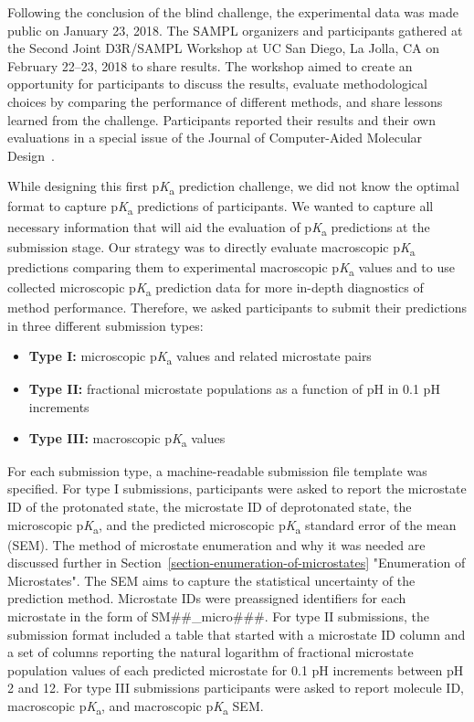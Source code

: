 \documentclass[9pt,lineno,final]{elife}
\newcommand{\pKa}{p\textit{K}\textsubscript{a}}
\begin{document}
Following the conclusion of the blind challenge, the experimental data was made public on January 23, 2018. 
The SAMPL organizers and participants gathered at the Second Joint D3R/SAMPL Workshop at UC San Diego, La Jolla, CA on February 22--23, 2018 to share results.
The workshop aimed to create an opportunity for participants to discuss the results, evaluate methodological choices by comparing the performance of different methods, and share lessons learned from  the challenge. 
Participants reported their results and their own evaluations in a special issue of the Journal of Computer-Aided Molecular Design~\citep{JCAMD_special_issue_pKa}. 

While designing this first \pKa{} prediction challenge, we did not know the optimal format to capture \pKa{} predictions of participants. 
We wanted to capture all necessary information that will aid the evaluation of \pKa{} predictions at the submission stage. 
Our strategy was to directly evaluate macroscopic \pKa{} predictions comparing them to experimental macroscopic \pKa{} values and to use collected microscopic \pKa{} prediction data for more in-depth diagnostics of method performance.
Therefore, we asked participants to submit their predictions in three different submission types: 
\begin{itemize}
\item {\bf Type I:} microscopic \pKa{} values and related microstate pairs
\item {\bf Type II:} fractional microstate populations as a function of pH in 0.1 pH increments
\item {\bf Type III:} macroscopic \pKa{} values
\end{itemize}

For each submission type, a machine-readable submission file template was specified. 
For type I submissions, participants were asked to report the microstate ID of the protonated state, the microstate ID of deprotonated state, the microscopic \pKa{}, and the predicted microscopic \pKa{} standard error of the mean (SEM).  
The method of microstate enumeration and why it was needed are discussed further in Section~\ref{section-enumeration-of-microstates} "Enumeration of Microstates".
The SEM aims to capture the statistical uncertainty of the prediction method. 
Microstate IDs were preassigned identifiers for each microstate in the form of SM\#\#\_micro\#\#\#. 
For type II submissions, the submission format included a table that started with a microstate ID column and a set of columns reporting the natural logarithm of fractional microstate population values of each predicted microstate for 0.1 pH increments between pH 2 and 12.
For type III submissions participants were asked to report molecule ID, macroscopic \pKa{}, and macroscopic \pKa{} SEM.  
\end{document}
